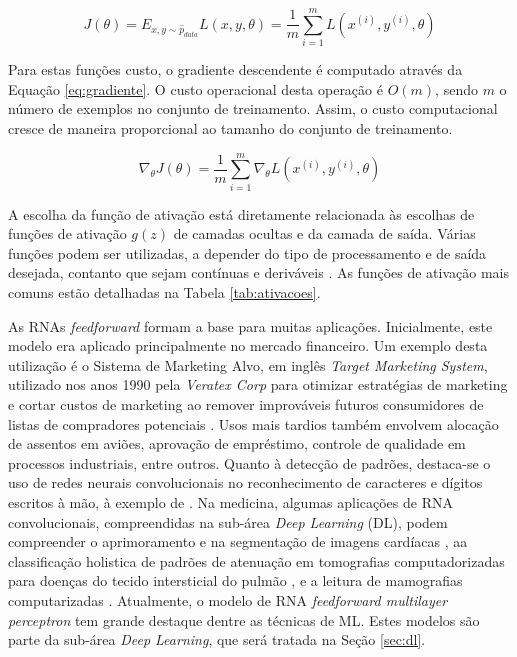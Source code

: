 \begin{equation}\label{eq:custo}
	J(\theta) = E_{x,y \sim \hat{p}_{data}} L(x, y, \theta) = \frac{1}{m} \sum_{i=1}^{m} L(x^{(i)}, y^{(i)}, \theta)
\end{equation}

Para estas funções custo, o gradiente descendente é computado através da Equação
\ref{eq:gradiente}. O custo operacional desta operação é $O(m)$, sendo $m$ o número de exemplos no conjunto de treinamento. Assim, o custo computacional cresce de maneira proporcional ao tamanho do conjunto de treinamento.

\begin{equation}\label{eq:gradiente}
	\nabla_{\theta} J(\theta) = \frac{1}{m} \sum_{i=1}^{m} \nabla_{\theta} L(x^{(i)}, y^{(i)}, \theta)
\end{equation}

A escolha da função de ativação está diretamente relacionada às escolhas de funções de ativação $g(z)$ de camadas ocultas e da camada de saída. Várias funções podem ser utilizadas, a depender do tipo de processamento e de saída desejada, contanto que sejam contínuas e deriváveis \cite{hornik1991approximation}. As funções de ativação mais comuns estão detalhadas na Tabela \ref{tab:ativacoes}.



As RNAs \emph{feedforward} formam a base para muitas aplicações. Inicialmente, este modelo era aplicado principalmente no mercado financeiro. Um exemplo desta utilização é o Sistema de Marketing Alvo, em inglês \emph{Target Marketing System}, utilizado nos anos 1990 pela \emph{Veratex Corp} para otimizar estratégias de marketing e cortar custos de marketing ao remover improváveis futuros consumidores de listas de compradores potenciais \cite{widrow1994neural}. Usos mais tardios também envolvem alocação de assentos em aviões, aprovação de empréstimo, controle de qualidade em processos industriais, entre outros. Quanto à detecção de padrões, destaca-se o uso de redes neurais convolucionais no reconhecimento de caracteres e dígitos escritos à mão, à exemplo de \cite{lenet}. Na medicina, algumas aplicações de RNA convolucionais, compreendidas na sub-área \emph{Deep Learning} (DL), podem compreender o aprimoramento e na segmentação de imagens cardíacas \cite{oktay2018anatomically}, aa classificação holistica de padrões de atenuação em tomografias computadorizadas para doenças do tecido intersticial do pulmão \cite{mingchen2018holistic}, e a leitura de mamografias computarizadas \cite{dubrovina2018mammography}. Atualmente, o modelo de RNA \emph{feedforward multilayer perceptron} tem grande destaque dentre as técnicas de ML. Estes modelos são parte da sub-área \emph{Deep Learning}, que será tratada na Seção \ref{sec:dl}.
